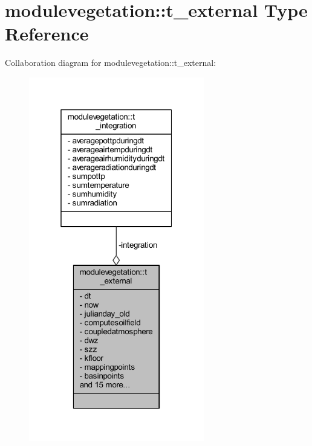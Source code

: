 \hypertarget{structmodulevegetation_1_1t__external}{}\section{modulevegetation\+:\+:t\+\_\+external Type Reference}
\label{structmodulevegetation_1_1t__external}


Collaboration diagram for modulevegetation\+:\+:t\+\_\+external\+:\nopagebreak
\begin{figure}[H]
\begin{center}
\leavevmode
\includegraphics[width=217pt]{structmodulevegetation_1_1t__external__coll__graph}
\end{center}
\end{figure}

